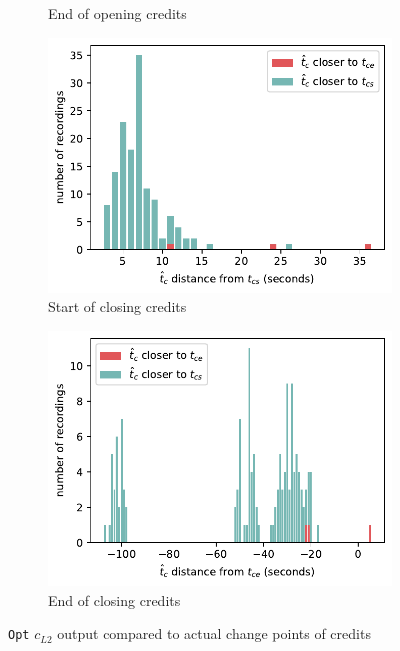 \begin{figure}[H]
\begin{subfigure}[t]{.49\textwidth}
    \caption{End of opening credits}
    \label{fig:t_diff_opt_oe}
  \end{subfigure}
  \begin{subfigure}[t]{.49\textwidth}
      \centering
      \includegraphics[width=\linewidth]{../plots/distances/opt_l2_dist_end_first.pdf}
      \caption{Start of closing credits}
      \label{fig:t_diff_opt_cs}
    \end{subfigure}
    \begin{subfigure}[t]{.49\textwidth}
      \centering
      \includegraphics[width=\linewidth]{../plots/distances/opt_l2_dist_end_last.pdf}
      \caption{End of closing credits}
      \label{fig:t_diff_opt_ce}
    \end{subfigure}
  \caption{\texttt{Opt} $c_{L2}$ output compared to actual change points of credits}
  \label{fig:t_diff_opt_credits}
\end{figure}

